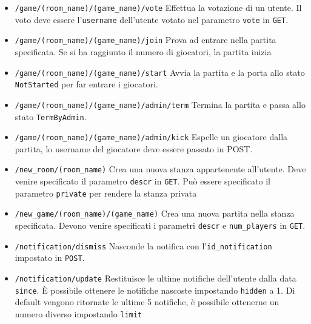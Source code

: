 \begin{itemize}
	\item \texttt{/game/(room\_name)/(game\_name)/vote} Effettua la votazione di un utente. Il voto deve essere l'\texttt{username} dell'utente votato nel parametro \texttt{vote} in \texttt{GET}.
	
	\item \texttt{/game/(room\_name)/(game\_name)/join} Prova ad entrare nella partita specificata. Se si ha raggiunto il numero di giocatori, la partita inizia
	
	\item \texttt{/game/(room\_name)/(game\_name)/start} Avvia la partita e la porta allo stato \texttt{NotStarted} per far entrare i giocatori.
	
	\item \texttt{/game/(room\_name)/(game\_name)/admin/term} Termina la partita e passa allo stato \texttt{TermByAdmin}.
	
	\item \texttt{/game/(room\_name)/(game\_name)/admin/kick} Espelle un giocatore dalla partita, lo username del giocatore deve essere passato in POST.
	
	\item \texttt{/new\_room/(room\_name)} Crea una nuova stanza appartenente all'utente. Deve venire specificato il parametro \texttt{descr} in \texttt{GET}. Può essere specificato il parametro \texttt{private} per rendere la stanza privata
	
	\item \texttt{/new\_game/(room\_name)/(game\_name)} Crea una nuova partita nella stanza specificata. Devono venire specificati i parametri \texttt{descr} e \texttt{num\_players} in \texttt{GET}.
	
	\item \texttt{/notification/dismiss} Nasconde la notifica con l'\texttt{id\_notification} impostato in \texttt{POST}.
	
	\item \texttt{/notification/update} Restituisce le ultime notifiche dell'utente dalla data \texttt{since}. È possibile ottenere le notifiche nascoste impostando \texttt{hidden} a 1. Di default vengono ritornate le ultime 5 notifiche, è possibile ottenerne un numero diverso impostando \texttt{limit}
	
\end{itemize}